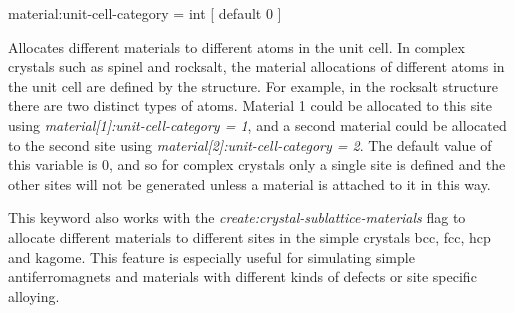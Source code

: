 {\zicf material:unit-cell-category = int [ default 0 ]} Allocates different materials to different atoms in the unit cell. In complex crystals such as spinel and rocksalt, the material allocations of
different atoms in the unit cell are defined by the structure. For example, in the rocksalt structure there are two distinct types of atoms. Material 1 could be allocated to this site using \textit{material[1]:unit-cell-category = 1}, and a second material could be allocated to the second site using
\textit{material[2]:unit-cell-category = 2}. The default value of this variable is 0, and so for complex crystals only a single site is defined and the other sites will not be generated unless a material is attached to it in this way.

This keyword also works with the \textit{create:crystal-sublattice-materials} flag to allocate different materials to different sites in the simple crystals bcc, fcc, hcp and kagome. This feature is especially useful for simulating simple antiferromagnets and materials with different kinds of defects or site specific alloying.










%
